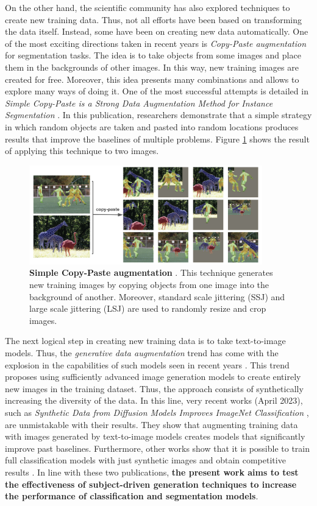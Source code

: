 On the other hand, the scientific community has also explored techniques to create new training data. Thus, not all efforts have been based on transforming the data itself. Instead, some have been on creating new data automatically. One of the most exciting directions taken in recent years is \textit{Copy-Paste augmentation} for segmentation tasks. The idea is to take objects from some images and place them in the backgrounds of other images. In this way, new training images are created for free. Moreover, this idea presents many combinations and allows to explore many ways of doing it. One of the most successful attempts is detailed in \textit{Simple Copy-Paste is a Strong Data Augmentation Method for Instance Segmentation} \cite{ghiasi2021simple}. In this publication, researchers demonstrate that a simple strategy in which random objects are taken and pasted into random locations produces results that improve the baselines of multiple problems. Figure \ref{fig:copy-paste} shows the result of applying this technique to two images.

\begin{figure}
    \centering
    \includegraphics[width=0.9\textwidth]{Pictures/copy-paste.png} 
    \caption{\textbf{Simple Copy-Paste augmentation} \cite{ghiasi2021simple}. This technique generates new training images by copying objects from one image into the background of another. Moreover, standard scale jittering (SSJ) and large scale jittering (LSJ) are used to randomly resize and crop images.}
    \label{fig:copy-paste}
\end{figure}

The next logical step in creating new training data is to take text-to-image models. Thus, the \textit{generative data augmentation} trend has come with the explosion in the capabilities of such models seen in recent years \cite{rombach2022high, dhariwal2021diffusion}. This trend proposes using sufficiently advanced image generation models to create entirely new images in the training dataset. Thus, the approach consists of synthetically increasing the diversity of the data. In this line, very recent works (April 2023), such as \textit{Synthetic Data from Diffusion Models Improves ImageNet Classification} \cite{azizi2023synthetic}, are unmistakable with their results. They show that augmenting training data with images generated by text-to-image models creates models that significantly improve past baselines. Furthermore, other works show that it is possible to train full classification models with just synthetic images and obtain competitive results \cite{sariyildiz2023fake}. In line with these two publications, \textbf{the present work aims to test the effectiveness of subject-driven generation techniques to increase the performance of classification and segmentation models}.